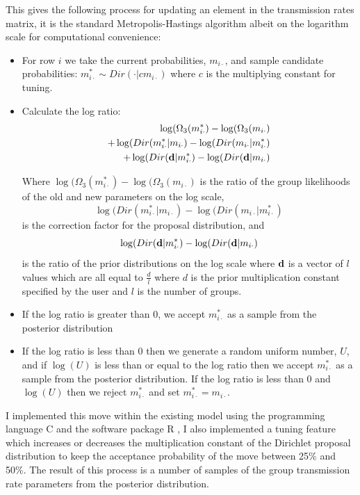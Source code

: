 \documentclass[11pt,a4paper]{report}
\begin{document}
This gives the following process for updating an element in the transmission rates matrix, it is the standard Metropolis-Hastings algorithm albeit on the logarithm scale for computational convenience:
\begin{itemize}
\item For row $i$ we take the current probabilities, $m_{i \cdot}$, and sample candidate probabilities: $m_{i \cdot}^{*} \sim Dir(\cdot|cm_{i \cdot}) $ where $c$ is the multiplying constant for tuning.
\item Calculate the log ratio: 
\begin{equation}
\begin{split}
\log(\Omega_3(m_{i \cdot}^{*}) - \log(\Omega_3(m_{i \cdot}) \\ +  \log(Dir(m_{i \cdot}^{*}|m_{i \cdot}) - \log(Dir(m_{i \cdot}|m_{i \cdot}^{*}) \\ + \log(Dir({\bf d}|m_{i \cdot}^{*}) - \log(Dir({\bf d}|m_{i \cdot})
\end{split}
\end{equation}

Where $\log(\Omega_3(m_{i \cdot}^{*}) - \log(\Omega_3(m_{i \cdot})$ is the ratio of the group likelihoods of the old and new parameters on the log scale,
 \[ \log(Dir(m_{i \cdot}^{*}|m_{i \cdot}) - \log(Dir(m_{i \cdot}|m_{i \cdot}^{*}) \]
is the correction factor for the proposal distribution, and
\[\log(Dir({\bf d}|m_{i \cdot}^{*}) - \log(Dir({\bf d}|m_{i \cdot})\]
is the ratio of the prior distributions on the log scale where ${\bf d}$ is a vector of $l$ values which are all equal to $\frac{d}{l}$ where $d$ is the prior multiplication constant specified by the user and $l$ is the number of groups.
\item If  the log ratio is greater than 0, we accept $m_{i \cdot}^{*}$ as a sample from the posterior distribution
\item If the log ratio is less than 0 then we generate a random uniform number, $U$, and if $\log(U)$ is less than or equal to the log ratio then we accept $m_{i \cdot}^{*}$ as a sample from the posterior distribution. If the log ratio is less than 0 and $\log(U)$ then we reject $m_{i \cdot}^{*}$ and set $m_{i \cdot}^{*}= m_{i \cdot}$.
\end{itemize}

I implemented this move within the existing model using the programming language C and the software package R \citep{R14}, I also implemented a tuning feature which increases or decreases the multiplication constant of the Dirichlet proposal distribution to keep the acceptance probability of the move between 25\% and 50\%. The result of this process is a number of samples of the group transmission rate parameters from the posterior distribution.
\end{document}
